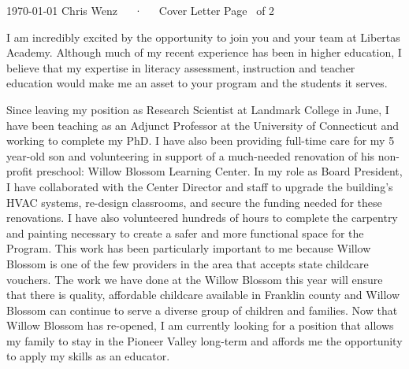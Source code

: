 \documentclass[11pt, a4paper]{awesome-cv}
\begin{document}
\makecvheader[C]

\makecvfooter
  {\today}
  {Chris Wenz~~~·~~~Cover Letter}
  {Page \thepage\ of 2}
\makelettertitle

\begin{cvletter}

I am incredibly excited by the opportunity to join you and your team at Libertas Academy. Although much of my recent experience has been in higher education, I believe that my expertise in literacy assessment, instruction and teacher education would make me an asset to your program and the students it serves.

Since leaving my position as Research Scientist at Landmark College in June, I have been teaching as an Adjunct Professor at the University of Connecticut and working to complete my PhD. I have also been providing full-time care for my 5 year-old son and volunteering in support of a much-needed renovation of his non-profit preschool: Willow Blossom Learning Center. In my role as Board President, I have collaborated with the Center Director and staff to upgrade the building's HVAC systems, re-design classrooms, and secure the funding needed for these renovations. I have also volunteered hundreds of hours to complete the carpentry and painting necessary to create a safer and more functional space for the Program. This work has been particularly important to me because Willow Blossom is one of the few providers in the area that accepts state childcare vouchers. The work we have done at the Willow Blossom this year will ensure that there is quality, affordable childcare available in Franklin county and Willow Blossom can continue to serve a diverse group of children and families. Now that Willow Blossom has re-opened, I am currently looking for a position that allows my family to stay in the Pioneer Valley long-term and affords me the opportunity to apply my skills as an educator. 


\end{cvletter}
\end{document}
